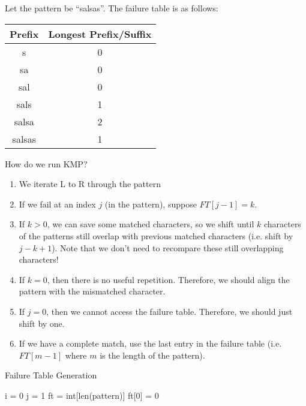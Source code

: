 \documentclass[a4paper]{article}
\begin{document}
\begin{eg}
	Let the pattern be ``salsas''. The failure table is as follows:
	\begin{center}
		\begin{tabular}{|c|c|}
			\hline
			\textbf{Prefix} & \textbf{Longest Prefix/Suffix} \\
			\hline
			s & 0 \\
			sa & 0 \\
			sal & 0 \\
			sals & 1 \\
			salsa & 2 \\
			salsas & 1 \\
			\hline
		\end{tabular}
	\end{center}
\end{eg}

How do we run KMP?
\begin{enumerate}
	\item We iterate L to R through the pattern
	\item If we fail at an index \( j \) (in the pattern), suppose \( FT[j-1]=k \).
	\item If \( k > 0  \), we can save some matched characters, so we shift until \( k \) characters of the patterns still overlap with previous matched characters (i.e. shift by \( j - k + 1 \)). Note that we don't need to recompare these still overlapping characters!
	\item If \( k=0 \), then there is no useful repetition. Therefore, we should align the pattern with the mismatched character.
	\item If \( j=0 \), then we cannot access the failure table. Therefore, we should just shift by one.
	\item If we have a complete match, use the last entry in the failure table (i.e. \( FT[m-1] \) where \( m \) is the length of the pattern).
\end{enumerate}

\begin{algorithm}[H]
	\caption{Failure Table Generation}
	i = 0 
	j = 1 
	ft = int[len(pattern)]\;
	ft[0] = 0\;
\end{algorithm}
\end{document}
